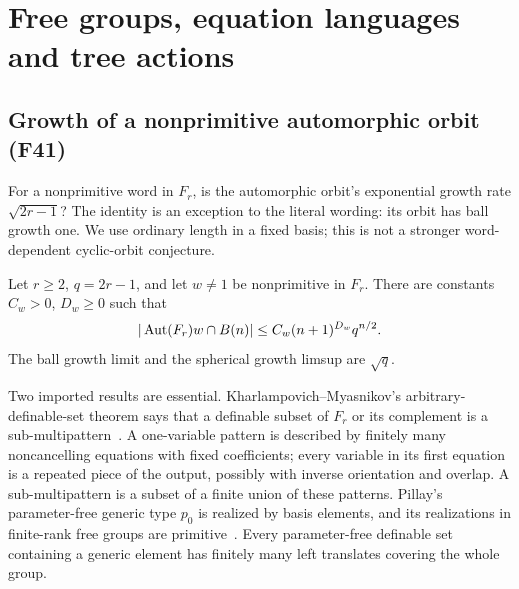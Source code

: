 \section{Free groups, equation languages and tree actions}\label{sec:free}

\subsection{Growth of a nonprimitive automorphic orbit (F41)}\label{sec:f41}
For a nonprimitive word in $F_r$, is the automorphic orbit's exponential
growth rate $\sqrt{2r-1}$? The identity is an exception to the literal
wording: its orbit has ball growth one. We use ordinary length in a
fixed basis; this is not a stronger word-dependent cyclic-orbit conjecture.

\begin{theorem}\label{prop:f41}
Let $r\ge2$, $q=2r-1$, and let $w\ne1$ be nonprimitive in $F_r$.
There are constants $C_w>0$, $D_w\ge0$ such that
\[
 |\operatorname{Aut}(F_r)w\cap B(n)|\le C_w(n+1)^{D_w}q^{n/2}.
\]
The ball growth limit and the spherical growth limsup are $\sqrt q$.
\end{theorem}

Two imported results are essential. Kharlampovich--Myasnikov's
arbitrary-definable-set theorem says that a definable subset of $F_r$
or its complement is a sub-multipattern~\cite[Definitions 5--6,
Theorem 13]{km}. A one-variable pattern is described by finitely many
noncancelling equations with fixed coefficients; every variable in its
first equation is a repeated piece of the output, possibly with inverse
orientation and overlap. A sub-multipattern is a subset of a finite
union of these patterns. Pillay's parameter-free generic type $p_0$
is realized by basis elements, and its realizations in finite-rank free
groups are primitive~\cite[Fact 1.10, Theorem 2.1]{pillay}. Every
parameter-free definable set containing a generic element has finitely
many left translates covering the whole group.

